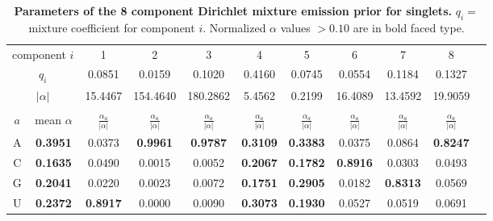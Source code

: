 \begin{table}
\footnotesize
\begin{center}
\begin{tabular}{|c|c|c|c|c|c|c|c|c|c|c|} \hline
\multicolumn{2}{|c|}{component $i$} & 1 & 2 & 3 & 4 & 5 & 6 & 7 & 8 \\
\multicolumn{2}{|c|}{$q_i$} & 0.0851 & 0.0159 & 0.1020 & 0.4160 & 0.0745 & 0.0554 & 0.1184 & 0.1327 \\  
\multicolumn{2}{|c|}{$|\alpha|$} & 15.4467 & 154.4640 & 180.2862 & 5.4562 & 0.2199 & 16.4089 & 13.4592 & 19.9059 \\ \hline 
\multicolumn{10}{c}{} \\ \hline

$a$ & mean $\alpha$ & $\frac{\alpha_a}{|\alpha|}$ & $\frac{\alpha_a}{|\alpha|}$ & $\frac{\alpha_a}{|\alpha|}$ & $\frac{\alpha_a}{|\alpha|}$ & $\frac{\alpha_a}{|\alpha|}$ & $\frac{\alpha_a}{|\alpha|}$ & $\frac{\alpha_a}{|\alpha|}$ & $\frac{\alpha_a}{|\alpha|}$ \\ \hline 
A & \textbf{0.3951} & 0.0373 & \textbf{0.9961} & \textbf{0.9787} & \textbf{0.3109} & \textbf{0.3383} & 0.0375 & 0.0864 & \textbf{0.8247} \\  
C & \textbf{0.1635} & 0.0490 & 0.0015 & 0.0052 & \textbf{0.2067} & \textbf{0.1782} & \textbf{0.8916} & 0.0303 & 0.0493 \\  
G & \textbf{0.2041} & 0.0220 & 0.0023 & 0.0072 & \textbf{0.1751} & \textbf{0.2905} & 0.0182 & \textbf{0.8313} & 0.0569 \\  
U & \textbf{0.2372} & \textbf{0.8917} & 0.0000 & 0.0090 & \textbf{0.3073} & \textbf{0.1930} & 0.0527 & 0.0519 & 0.0691 \\ \hline 


\end{tabular}
\end{center}

\normalfont\rmfamily
\caption{\textbf{Parameters of the 8 component Dirichlet mixture
    emission prior for singlets.} $q_i =$ mixture coefficient for
    component $i$. Normalized $\alpha$ values $> 0.10$ are in bold
    faced type.}
\label{tbl:singlets}
\end{table}
